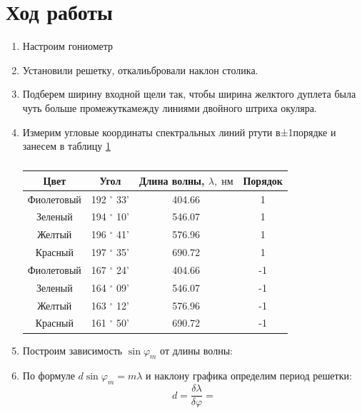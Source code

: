 \documentclass[a4paper]{article}
\begin{document}
\section{Ход работы}

\begin{enumerate}
    \item Настроим гониометр
    \item Установили решетку, откалиьбровали наклон столика.
    \item Подберем ширину входной щели так, чтобы ширина желктого дуплета была чуть больше промежуткамежду линиями двойного штриха окуляра.
    \item Измерим угловые координаты спектральных линий ртути в±1порядке и занесем в таблицу \ref{t1}

    \begin{table}[H]
        \begin{center}
            \begin{tabular}{|c|c|c|c|}
                \hline
                Цвет & Угол & Длина волны, $\lambda, \; нм$ & Порядок \\ \hline 
                Фиолетовый & 192 $^{\circ}$ 33'&404.66& 1\\ \hline
                Зеленый & 194 $^{\circ}$ 10' & 546.07 & 1 \\\hline
                Желтый & 196 $^{\circ}$ 41' &576.96 & 1 \\ \hline
                Красный & 197 $^{\circ}$ 35' & 690.72 & 1\\ \hline
                Фиолетовый & 167 $^{\circ}$ 24' & 404.66 & -1 \\ \hline 
                Зеленый & 164 $^{\circ}$ 09' & 546.07 & -1 \\\hline
                Желтый & 163 $^{\circ}$ 12' &576.96 & -1 \\ \hline
                Красный & 161 $^{\circ}$ 50' & 690.72 & -1\\ \hline
                
            \end{tabular}
            \caption{}
            \label{t1}
        \end{center}
    \end{table}

    \item Построим зависимость $\sin{\varphi_m}$ от длины волны:
    \item По формуле $d \sin{\varphi_m} = m \lambda$ и наклону графика определим период решетки:
    $$d = \frac{\delta \lambda}{\delta \varphi} = $$


\end{enumerate}
\end{document}
